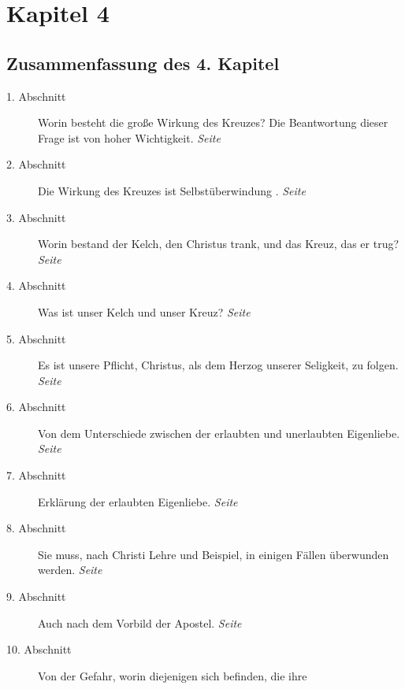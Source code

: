

\chapter{Kapitel 4} \label{kap4}

\section{Zusammenfassung des 4. Kapitel}

\begin{description}
\item[1. Abschnitt] Worin besteht die große Wirkung des Kreuzes? Die
Beantwortung dieser Frage ist von hoher Wichtigkeit.
\dotfill \textit{Seite~\pageref{kap4_ab1}}\\
\item[2. Abschnitt] Die Wirkung des Kreuzes ist Selbstüberwindung
.
\dotfill \textit{Seite~\pageref{kap4_ab2}}\\
\item[3. Abschnitt] Worin bestand der Kelch, den Christus trank, und das Kreuz,
das er trug?
\dotfill \textit{Seite~\pageref{kap4_ab3}}\\
\item[4. Abschnitt] Was ist unser Kelch und unser Kreuz?
\dotfill \textit{Seite~\pageref{kap4_ab4}}\\
\item[5. Abschnitt] Es ist unsere Pflicht, Christus, als dem Herzog unserer
Seligkeit, zu folgen.
\dotfill \textit{Seite~\pageref{kap4_ab5}}\\
\item[6. Abschnitt] Von dem Unterschiede zwischen der erlaubten und unerlaubten
Eigenliebe.
\dotfill \textit{Seite~\pageref{kap4_ab6}}\\
\item[7. Abschnitt] Erklärung der erlaubten Eigenliebe.
\dotfill \textit{Seite~\pageref{kap4_ab7}}\\
\item[8. Abschnitt] Sie muss, nach Christi Lehre und Beispiel, in einigen Fällen
überwunden werden.
\dotfill \textit{Seite~\pageref{kap4_ab8}}\\
\item[9. Abschnitt] Auch nach dem Vorbild der Apostel.
\dotfill \textit{Seite~\pageref{kap4_ab9}}\\
\item[10. Abschnitt] Von der Gefahr, worin diejenigen sich befinden, die ihre

\end{description}
